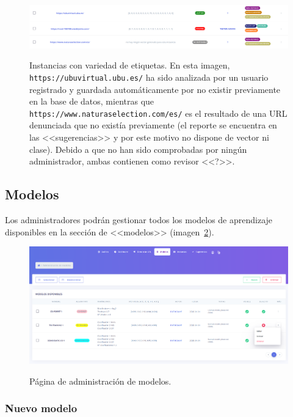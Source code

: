 \begin{figure}[h]
	\caption[Manual de usuario: ejemplos de etiquetas]{Instancias con variedad de etiquetas. En esta imagen, \texttt{https://ubuvirtual.ubu.es/} ha sido analizada por un usuario registrado y guardada automáticamente por no existir previamente en la base de datos, mientras que \texttt{https://www.naturaselection.com/es/} es el resultado de una URL denunciada que no existía previamente (el reporte se encuentra en las <<sugerencias>> y por este motivo no dispone de vector ni clase). Debido a que no han sido comprobadas por ningún administrador, ambas contienen como revisor <<?>>.}
	\centering
	\includegraphics[width=\textwidth]{../img/anexos/user_guide/6_instances_more_labels}
	\label{e-6:more-labels}
\end{figure}


\subsection{Modelos}
\label{s-e:models}

Los administradores podrán gestionar todos los modelos de aprendizaje disponibles en la sección de <<modelos>> (imagen~\ref{e-5:models}).

\begin{figure}[h]
	\caption[Manual de usuario: página de modelos]{Página de administración de modelos.}
	\centering
	\includegraphics[width=\textwidth]{../img/anexos/user_guide/5_models}
	\label{e-5:models}
\end{figure}

\subsubsection{Nuevo modelo}
\label{s-e:nuevo-modelo}

